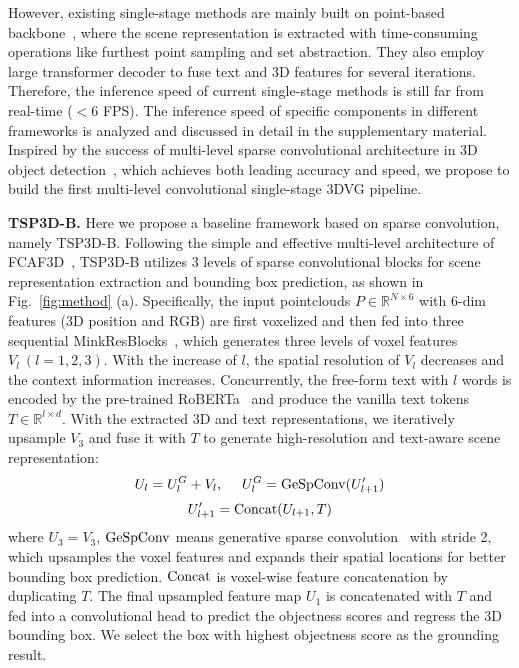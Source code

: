 However, existing single-stage methods are mainly built on point-based backbone~\citep{qi2017pointnetpp}, where the scene representation is extracted with time-consuming operations like furthest point sampling and set abstraction. They also employ large transformer decoder to fuse text and 3D features for several iterations. Therefore, the inference speed of current single-stage methods is still far from real-time ($<6$ FPS).
The inference speed of specific components in different frameworks is analyzed and discussed in detail in the supplementary material.
Inspired by the success of multi-level sparse convolutional architecture in 3D object detection~\citep{rukhovich2023tr3d}, which achieves both leading accuracy and speed, we propose to build the first multi-level convolutional single-stage 3DVG pipeline.

 
\textbf{TSP3D-B.} Here we propose a baseline framework based on sparse convolution, namely TSP3D-B. Following the simple and effective multi-level architecture of FCAF3D~\citep{rukhovich2022fcaf3d}, TSP3D-B utilizes 3 levels of sparse convolutional blocks for scene representation extraction and bounding box prediction, as shown in Fig.~\ref{fig:method} (a). 
Specifically, the input pointclouds $P\in \mathbb{R}^{N \times 6}$ with 6-dim features (3D position and RGB) are first voxelized and then fed into three sequential MinkResBlocks~\citep{choy20194d}, which generates three levels of voxel features $V_l\ (l=1,2,3)$. With the increase of $l$, the spatial resolution of $V_l$ decreases and the context information increases.
Concurrently, the free-form text with $l$ words is encoded by the pre-trained RoBERTa~\citep{liu2019roberta} and produce the vanilla text tokens \( T  \in \mathbb{R}^{l \times d}\).
With the extracted 3D and text representations, we iteratively upsample $V_3$ and fuse it with $T$ to generate high-resolution and text-aware scene representation:
\begin{equation}\label{eq1}
    U_l=U^G_l+V_l,\ \ \ \ U^G_l={\rm GeSpConv}(U'_{l+1})
\end{equation}
\begin{equation}
    U'_{l+1}={\rm Concat}(U_{l+1}, T) 
\end{equation}
where $U_3=V_3$, ${\rm GeSpConv}$ means generative sparse convolution~\citep{gwak2020generative} with stride 2, which upsamples the voxel features and expands their spatial locations for better bounding box prediction. ${\rm Concat}$ is voxel-wise feature concatenation by duplicating $T$.
The final upsampled feature map $U_1$ is concatenated with $T$ and fed into a convolutional head to predict the objectness scores and regress the 3D bounding box. We select the box with highest objectness score as the grounding result.

